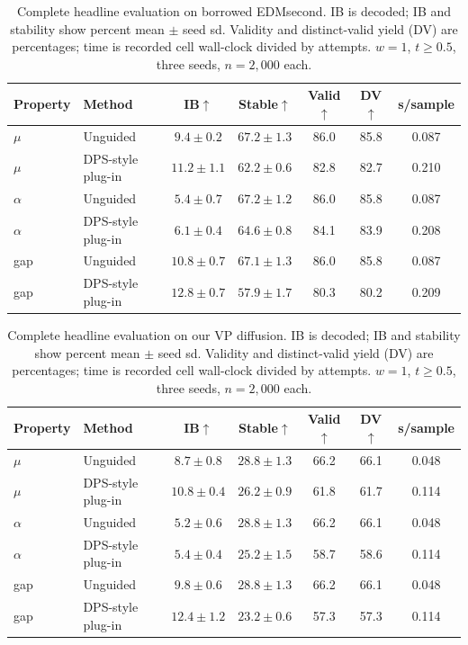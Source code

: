 \documentclass{article}
\begin{document}
\begin{table}[!htbp]
\centering\small
\caption{Complete headline evaluation on borrowed EDMsecond. IB is decoded; IB and stability show percent mean $\pm$ seed sd. Validity and distinct-valid yield (DV) are percentages; time is recorded cell wall-clock divided by attempts. $w=1$, $t\ge0.5$, three seeds, $n=2{,}000$ each.}
\label{tab:full-edm}
\begin{tabular}{llccccc}
\toprule
Property & Method & IB$\uparrow$ & Stable$\uparrow$ & Valid$\uparrow$ & DV$\uparrow$ & s/sample\\
\midrule
$\mu$ & Unguided & $9.4\pm0.2$ & $67.2\pm1.3$ & 86.0 & 85.8 & 0.087\\
$\mu$ & DPS-style plug-in & $11.2\pm1.1$ & $62.2\pm0.6$ & 82.8 & 82.7 & 0.210\\
\midrule
$\alpha$ & Unguided & $5.4\pm0.7$ & $67.2\pm1.2$ & 86.0 & 85.8 & 0.087\\
$\alpha$ & DPS-style plug-in & $6.1\pm0.4$ & $64.6\pm0.8$ & 84.1 & 83.9 & 0.208\\
\midrule
gap & Unguided & $10.8\pm0.7$ & $67.1\pm1.3$ & 86.0 & 85.8 & 0.087\\
gap & DPS-style plug-in & $12.8\pm0.7$ & $57.9\pm1.7$ & 80.3 & 80.2 & 0.209\\
\bottomrule
\end{tabular}
\end{table}
\clearpage
\begin{table}[!htbp]
\centering\small
\caption{Complete headline evaluation on our VP diffusion. IB is decoded; IB and stability show percent mean $\pm$ seed sd. Validity and distinct-valid yield (DV) are percentages; time is recorded cell wall-clock divided by attempts. $w=1$, $t\ge0.5$, three seeds, $n=2{,}000$ each.}
\label{tab:full-vp}
\begin{tabular}{llccccc}
\toprule
Property & Method & IB$\uparrow$ & Stable$\uparrow$ & Valid$\uparrow$ & DV$\uparrow$ & s/sample\\
\midrule
$\mu$ & Unguided & $8.7\pm0.8$ & $28.8\pm1.3$ & 66.2 & 66.1 & 0.048\\
$\mu$ & DPS-style plug-in & $10.8\pm0.4$ & $26.2\pm0.9$ & 61.8 & 61.7 & 0.114\\
\midrule
$\alpha$ & Unguided & $5.2\pm0.6$ & $28.8\pm1.3$ & 66.2 & 66.1 & 0.048\\
$\alpha$ & DPS-style plug-in & $5.4\pm0.4$ & $25.2\pm1.5$ & 58.7 & 58.6 & 0.114\\
\midrule
gap & Unguided & $9.8\pm0.6$ & $28.8\pm1.3$ & 66.2 & 66.1 & 0.048\\
gap & DPS-style plug-in & $12.4\pm1.2$ & $23.2\pm0.6$ & 57.3 & 57.3 & 0.114\\
\bottomrule
\end{tabular}
\end{table}
\end{document}
